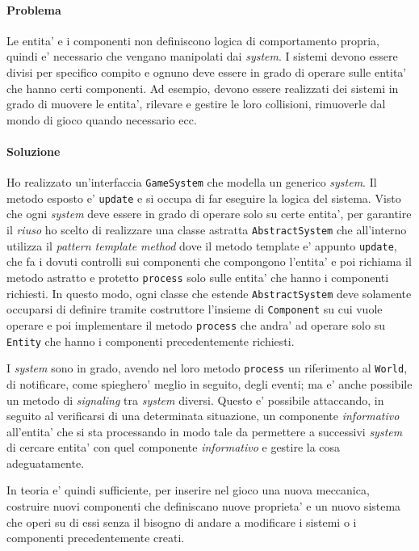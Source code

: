 \documentclass[a4paper,12pt]{report}
\begin{document}
\paragraph{Problema}
Le entita' e i componenti non definiscono logica di comportamento propria, quindi e' necessario che vengano manipolati dai \textit{system}. I sistemi devono essere divisi per specifico compito e ognuno deve essere in grado di operare sulle entita' che hanno certi componenti. Ad esempio, devono essere realizzati dei sistemi in grado di muovere le entita', rilevare e gestire le loro collisioni, rimuoverle dal mondo di gioco quando necessario ecc.

\paragraph[]{Soluzione}
Ho realizzato un'interfaccia \texttt{GameSystem} che modella un generico \textit{system}. Il metodo esposto e' \texttt{update} e si occupa di far eseguire la logica del sistema. Visto che ogni \textit{system} deve essere in grado di operare solo su certe entita', per garantire il \textit{riuso} ho scelto di realizzare una classe astratta \texttt{AbstractSystem} che all'interno utilizza il \textit{pattern template method} dove il metodo template e' appunto \texttt{update}, che fa i dovuti controlli sui componenti che compongono l'entita' e poi richiama il metodo astratto e protetto \texttt{process} solo sulle entita' che hanno i componenti richiesti. In questo modo, ogni classe che estende \texttt{AbstractSystem} deve solamente occuparsi di definire tramite costruttore l'insieme di \texttt{Component} su cui vuole operare e poi implementare il metodo \texttt{process} che andra' ad operare solo su \texttt{Entity} che hanno i componenti precedentemente richiesti.

I \textit{system} sono in grado, avendo nel loro metodo \texttt{process} un riferimento al \texttt{World}, di notificare, come spieghero' meglio in seguito, degli eventi; ma e' anche possibile un metodo di \textit{signaling} tra \textit{system} diversi. Questo e' possibile attaccando, in seguito al verificarsi di una determinata situazione, un componente \textit{informativo} all'entita' che si sta processando in modo tale da permettere a successivi \textit{system} di cercare entita' con quel componente \textit{informativo} e gestire la cosa adeguatamente.

In teoria e' quindi sufficiente, per inserire nel gioco una nuova meccanica, costruire nuovi componenti che definiscano nuove proprieta' e un nuovo sistema che operi su di essi senza il bisogno di andare a modificare i sistemi o i componenti precedentemente creati.
\end{document}
